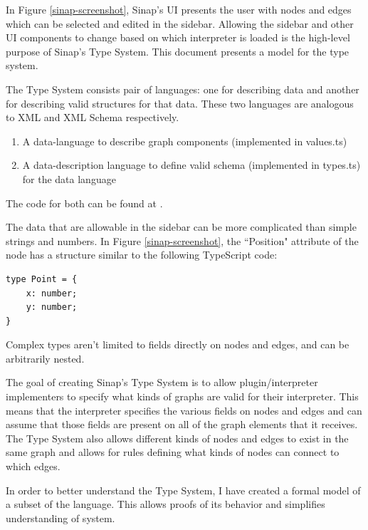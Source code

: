 \documentclass[12pt]{article}
\begin{document}
In Figure \ref{sinap-screenshot}, Sinap's UI
presents the user with nodes and edges which can be selected 
and edited in the sidebar. Allowing the sidebar and other UI components to change based
on which interpreter is loaded is the high-level purpose of Sinap's Type System. 
This document presents a model for the type system. 

The Type System consists pair of languages:
one for describing data and another for describing valid structures
for that data. These two languages are analogous to XML and XML Schema
\cite{Thompson:12:WXS} respectively.

\begin{enumerate}
    \item A data-language to describe graph components 
    (implemented in values.ts)
    \item A data-description language to define valid schema 
    (implemented in types.ts)
    for the data language
\end{enumerate}

The code for both can be found at \cite{sinap-types-code}.


The data that are allowable in the sidebar can be more complicated than
simple strings and numbers. In Figure \ref{sinap-screenshot}, the ``Position" attribute
of the node has a structure similar to the following TypeScript code:

\vspace{1ex}

\linespread{1}
\begin{verbatim}
type Point = {
    x: number;
    y: number;
}
\end{verbatim}

Complex types aren't limited to fields directly on nodes and edges,
and can be arbitrarily nested. 

The goal of creating Sinap's Type System is to allow plugin/interpreter
implementers to specify what 
kinds of graphs are valid for their interpreter. This means that 
the interpreter specifies the various fields on nodes and edges 
and can assume that those fields are present on all of the graph elements
that it receives. The Type System also allows different kinds of nodes and 
edges to exist in the same graph and allows for rules defining what kinds of
nodes can connect to which edges. 

In order to better understand the Type System, I have created a 
formal model of a subset of the language. This allows proofs of
its behavior and simplifies understanding of system. 
\end{document}

